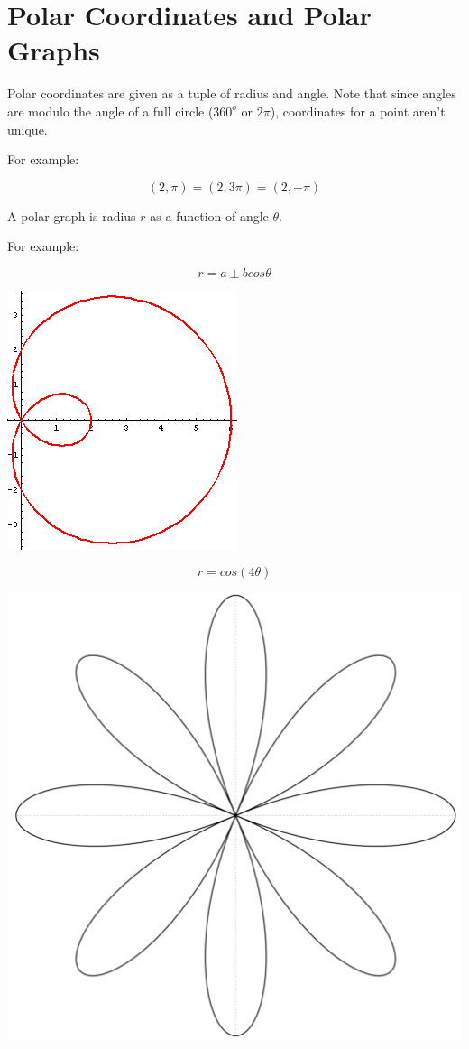 \documentclass{article}
\begin{document}
\section{Polar Coordinates and Polar Graphs}

Polar coordinates are given as a tuple of radius and angle.  Note that
since angles are modulo the angle of a full circle ($360^o$ or
$2\pi$), coordinates for a point aren't unique.

For example:

\[
(2,\pi) = (2,3\pi) = (2,-\pi)
\]

A polar graph is radius $r$ as a function of angle $\theta$.

For example:

\[
r = a \pm b cos \theta
\]

\includegraphics{Limacon}

\newpage

\[
r = cos(4 \theta)
\]

\includegraphics{Rose}
\end{document}
